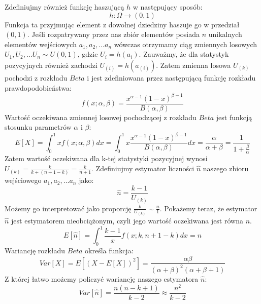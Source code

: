 Zdefiniujmy również funkcję haszującą $h$ w następujący sposób:
\begin{equation}
    h \colon \Omega \rightarrow (0, 1)
\end{equation}
Funkcja ta przyjmując element z dowolnej dziedziny haszuje go w przedział $(0,1)$. Jeśli rozpatrywany przez nas zbiór elementów posiada $n$ unikalnych elementów wejściowych $a_1, a_2, \dots a_n$ wówczas otrzymamy ciąg zmiennych losowych $U_1, U_2, \dots U_n \sim U(0,1)$, gdzie $U_i = h(a_i)$. Zauważmy, że dla statystyk pozycyjnych również zachodzi $U_{(i)} = h(a_{(i)})$.
Zatem zmienna losowa $U_{(k)}$ pochodzi z rozkładu $Beta$ i jest zdefiniowana przez następującą funkcję rozkładu prawdopodobieństwa:
\begin{equation}
    f(x; \alpha, \beta) = \frac{x^{\alpha-1}{(1-x)}^{\beta-1}}{B(\alpha, \beta)}
\end{equation}
Wartość oczekiwana zmiennej losowej pochodzącej z rozkładu $Beta$ jest funkcją stosunku parametrów $\alpha$ i $\beta$:
\begin{equation}
    E[X] = \int_0^1 xf(x; \alpha, \beta) dx = \int_0^1 x\frac{x^{\alpha-1}{(1-x)}^{\beta-1}}{B(\alpha, \beta)} dx = \frac{\alpha}{\alpha + \beta} = \frac{1}{1 + \frac{\beta}{\alpha}}
\end{equation}
Zatem wartość oczekiwana dla k-tej statystyki pozycyjnej wynosi $U_{(k)} = \frac{k}{k + (n + 1 - k)} = \frac{k}{n + 1}$. Zdefiniujmy estymator liczności $\hat{n}$ naszego zbioru wejściowego $a_1, a_2, \dots a_n$ jako:
\begin{equation}
    \hat{n} = \frac{k - 1}{U_{(k)}}
\end{equation}
Możemy go interpretować jako proporcję $\frac{k}{U_{(k)}} \sim \frac{n}{1}$.
Pokażemy teraz, że estymator $\hat{n}$ jest estymatorem nieobciążonym, czyli jego wartość oczekiwana jest równa $n$.
\begin{equation}
    E[\hat{n}] = \int_0^1 \frac{k - 1}{x}f(x; k, n+1-k) dx = n
\end{equation}
Wariancję rozkładu $Beta$ określa funkcja:
\begin{equation}
    Var[X] = E[(X - E[X])^2] = \frac{\alpha\beta}{(\alpha + \beta)^{2}(\alpha + \beta + 1)}
\end{equation}
Z której łatwo możemy policzyć wariancję naszego estymatora $\hat{n}$:
\begin{equation}
    Var[\hat{n}] = \frac{n(n - k + 1)}{k - 2} \approx \frac{n^2}{k - 2}
\end{equation}


